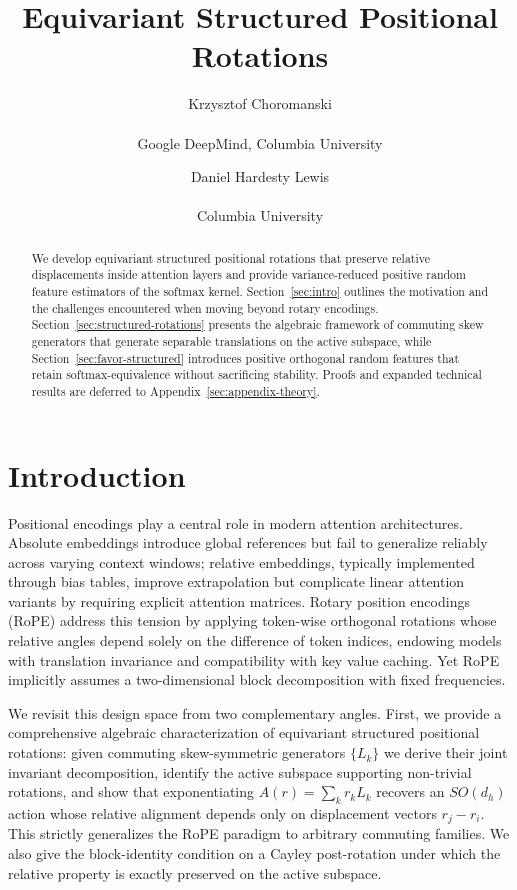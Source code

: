 \documentclass[11pt]{article}
\title{Equivariant Structured Positional Rotations}
\author{Krzysztof Choromanski\\\\Google DeepMind, Columbia University \and Daniel Hardesty Lewis\\\\Columbia University}
\date{}
\begin{document}
\maketitle

\begin{abstract}
We develop equivariant structured positional rotations that preserve relative displacements inside
attention layers and provide variance-reduced positive random feature estimators of the softmax
kernel. Section~\ref{sec:intro} outlines the motivation and the challenges encountered when moving
beyond rotary encodings. Section~\ref{sec:structured-rotations} presents the algebraic framework of
commuting skew generators that generate separable translations on the active subspace, while
Section~\ref{sec:favor-structured} introduces positive orthogonal random features that retain
softmax-equivalence without sacrificing stability. Proofs and expanded technical results are deferred
to Appendix~\ref{sec:appendix-theory}.
\end{abstract}

\section{Introduction}
\label{sec:intro}


Positional encodings play a central role in modern attention architectures. Absolute embeddings introduce global references but fail to generalize reliably across varying context windows; relative embeddings, typically implemented through bias tables, improve extrapolation but complicate linear attention variants by requiring explicit attention matrices. Rotary position encodings (RoPE) address this tension by applying token-wise orthogonal rotations whose relative angles depend solely on the difference of token indices, endowing models with translation invariance and compatibility with key value caching. Yet RoPE implicitly assumes a two-dimensional block decomposition with fixed frequencies.

We revisit this design space from two complementary angles. First, we provide a comprehensive algebraic characterization of equivariant structured positional rotations: given commuting skew-symmetric generators $\{L_k\}$ we derive their joint invariant decomposition, identify the active subspace supporting non-trivial rotations, and show that exponentiating $A(r) = \sum_k r_k L_k$ recovers an $SO(d_h)$ action whose relative alignment depends only on displacement vectors $r_j - r_i$. This strictly generalizes the RoPE paradigm to arbitrary commuting families. We also give the block-identity condition on a Cayley post-rotation under which the relative property is exactly preserved on the active subspace.
\end{document}
